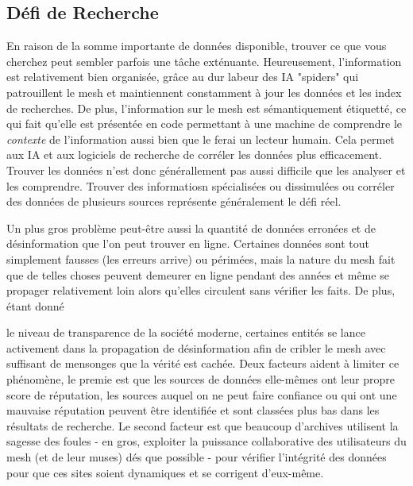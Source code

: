\subsection{Défi de Recherche} 

En raison de la somme importante de données disponible, trouver ce que vous cherchez peut sembler parfois une tâche exténuante. Heureusement, l'information est relativement bien organisée, grâce au dur labeur des IA "spiders" qui patrouillent le mesh et maintiennent constamment à jour les données et les index de recherches. De plus, l'information sur le mesh est sémantiquement étiquetté, ce qui fait qu'elle est présentée en code permettant à une machine de comprendre le \textit{contexte} de l'information aussi bien que le ferai un lecteur humain. Cela permet aux IA et aux logiciels de recherche de corréler les données plus efficacement. Trouver les données n'est donc générallement pas aussi difficile que les analyser et les comprendre. Trouver des informatiosn spécialisées ou dissimulées ou corréler des données de plusieurs sources représente généralement le défi réel. 

Un plus gros problème peut-être aussi la quantité de données erronées et de désinformation que l'on peut trouver en ligne. Certaines données sont tout simplement fausses (les erreurs arrive) ou périmées, mais la nature du mesh fait que de telles choses peuvent demeurer en ligne pendant des années et même se propager relativement loin alors qu'elles circulent sans vérifier les faits. De plus, étant donné 

le niveau de transparence de la société moderne, certaines entités se lance activement dans la propagation de désinformation afin de cribler le mesh avec suffisant de mensonges que la vérité est cachée. Deux facteurs aident à limiter ce phénomène, le premie est que les sources de données elle-mêmes ont leur propre score de réputation, les sources auquel on ne peut faire confiance ou qui ont une mauvaise réputation peuvent être identifiée et sont classées plus bas dans les résultats de recherche. Le second facteur est que beaucoup d'archives utilisent la sagesse des foules - en gros, exploiter la puissance collaborative des utilisateurs du mesh (et de leur muses) dés que possible - pour vérifier l'intégrité des données pour que ces sites soient dynamiques et se corrigent d'eux-même. 


